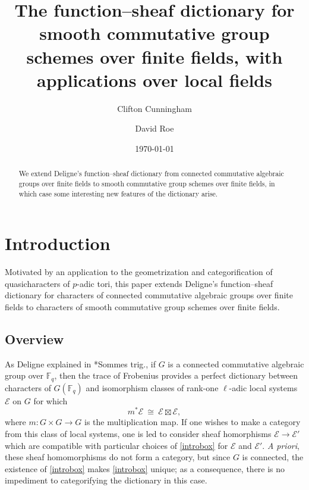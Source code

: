 \documentclass{amsart}
\title[The function--sheaf dictionary, with applications over local fields]{The function--sheaf dictionary for smooth commutative group schemes over finite fields, with applications over local fields}
\date{\today}
\author{Clifton Cunningham}
\author{David Roe}
\theoremstyle{plain}
\theoremstyle{definition}
\theoremstyle{remark}
\newcommand{\FF}{{\mathbb{F}}}
\newcommand{\iso}{{\ \cong\ }}
\newcommand{\qcs}[1]{{\mathcal{#1}}}
\begin{document}
\begin{abstract}
  We extend Deligne's function--sheaf dictionary from
  connected commutative algebraic groups over finite fields to smooth
  commutative group schemes over finite fields,
  in which case some interesting new features of the dictionary arise.
   \end{abstract}

\maketitle

\section{Introduction}

Motivated by an application to the geometrization and categorification of quasicharacters of $p$-adic tori,
this paper extends Deligne's function--sheaf dictionary for characters of connected commutative algebraic groups over finite fields to characters of smooth commutative group schemes over finite fields.

\subsection{Overview}

As Deligne explained in \cite{deligne:SGA4.5}*{Sommes trig.}, if $G$ is a connected commutative algebraic group over $\FF_q$, then the trace of Frobenius provides a perfect dictionary between characters of $G(\FF_q)$ and isomorphism classes of rank-one $\ell$-adic local systems $\mathcal{E}$ on $G$ for which 
\begin{equation}\label{introbox}
m^* \qcs{E} \iso \qcs{E} \boxtimes \qcs{E},\tag{0}
\end{equation}
where $m : G\times G\to G$ is the multiplication map.
%
If one wishes to make a category from this class of local systems, one is led to consider sheaf homorphisms $\qcs{E} \to \qcs{E}'$ which are compatible with particular choices of \eqref{introbox} for $\qcs{E}$ and $\qcs{E'}$. 
{\it A priori}, these sheaf homomorphisms do not form a category, but since $G$ is connected, the existence of \eqref{introbox} makes \eqref{introbox} unique; as a consequence, there is no impediment to categorifying the dictionary in this case.
\end{document}

